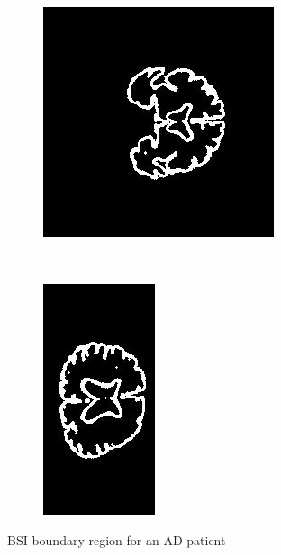 \documentclass[11pt,a4paper,oneside]{report}
\begin{document}
\begin{figure}[H]
\begin{subfigure}[b]{0.3\textwidth}
                \includegraphics[width=\textwidth, angle=90]{figures/diff/bsiBoundary_y.jpg}
        \end{subfigure}
        ~~~~ %
        \begin{subfigure}[b]{0.3\textwidth}
                \includegraphics[width=\textwidth, height=\textwidth, trim=0 20 0 20, clip=true, angle=90 ]{figures/diff/bsiBoundary_z.jpg}
        \end{subfigure}
        \caption{BSI boundary region for an AD patient}\label{fig:bsiBoundary}
\end{figure}
\end{document}
